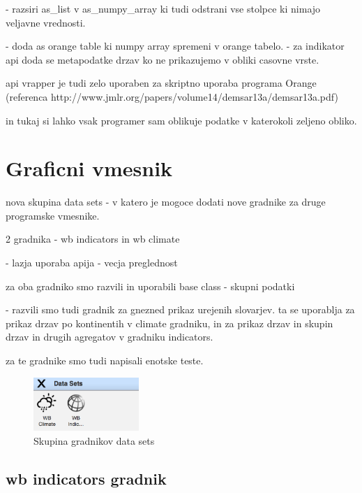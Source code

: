 - razsiri as\_list v as\_numpy\_array ki tudi odstrani vse stolpce ki nimajo 
  veljavne vrednosti.

- doda as orange table ki numpy array spremeni v orange tabelo.
  - za indikator api doda se metapodatke drzav ko ne prikazujemo v obliki casovne vrste.


api vrapper je tudi zelo uporaben za skriptno uporaba programa Orange 
(referenca http://www.jmlr.org/papers/volume14/demsar13a/demsar13a.pdf)

in tukaj si lahko vsak programer sam oblikuje podatke v katerokoli zeljeno obliko.






\section{Graficni vmesnik}


 
nova skupina data sets 
 - v katero je mogoce dodati nove gradnike za druge programske vmesnike.

2 gradnika - wb indicators in wb climate

- lazja uporaba apija
- vecja preglednost


za oba gradniko smo razvili in uporabili base class - skupni podatki

- razvili smo tudi gradnik za gnezned prikaz urejenih slovarjev.
  ta se uporablja za prikaz drzav po kontinentih v climate gradniku,
  in za prikaz drzav in skupin drzav in drugih agregatov v gradniku
  indicators.


za te gradnike smo tudi napisali enotske teste.


\begin{figure}
  \begin{center}
    \includegraphics[width=4cm]{pic/data_sets_group.png}
  \end{center}
  \caption{Skupina gradnikov data sets}
  \label{drevo}
\end{figure} 


\subsection{wb indicators gradnik}


